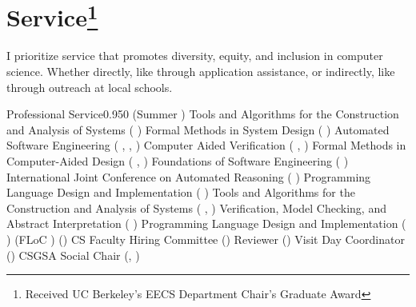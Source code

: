 \documentclass{federico_cv}
\begin{document}
\section{Service\protect\footnote{Received UC Berkeley's EECS Department Chair's Graduate Award}}

I prioritize service that promotes diversity, equity, and inclusion in computer
science. Whether directly, like through application assistance, or
indirectly, like through outreach at local schools.

\begin{tblSubSection}{Professional Service}{0.95}{0}
{ (Summer )}
{Tools and Algorithms for the Construction and Analysis of Systems ( )}
{Formal Methods in System Design ( )}
{Automated Software Engineering ( , , )}
{Computer Aided Verification ( , )}
{Formal Methods in Computer-Aided Design ( , )}
{Foundations of Software Engineering ( )}
{International Joint Conference on Automated Reasoning ( )}
{Programming Language Design and Implementation ( )}
{Tools and Algorithms for the Construction and Analysis of Systems ( , )}
{Verification, Model Checking, and Abstract Interpretation ( )}
{Programming Language Design and Implementation ( )}
{ (FLoC )}
{ ()}
{CS Faculty Hiring Committee ()}
{ Reviewer ()}
{Visit Day Coordinator ()}
{CSGSA Social Chair (, )}
\end{tblSubSection}
\end{document}

